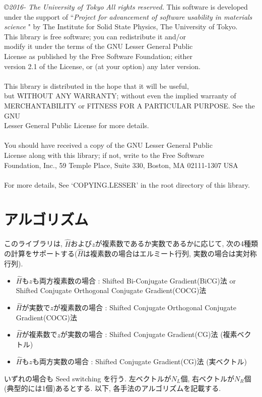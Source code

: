 \documentclass[12pt,titlepage]{jarticle}
\begin{document}
\noindent
{\it \copyright 2016- The University of Tokyo} {\it  All rights reserved.}
This software is developed under the support of ``{\it Project for advancement of software usability in materials science }" by The Institute for Solid State Physics, The University of Tokyo. 
 \\
This library is free software; you can redistribute it and/or \\
modify it under the terms of the GNU Lesser General Public \\
License as published by the Free Software Foundation; either \\
version 2.1 of the License, or (at your option) any later version. \\
 \\
This library is distributed in the hope that it will be useful, \\
but WITHOUT ANY WARRANTY; without even the implied warranty of \\
MERCHANTABILITY or FITNESS FOR A PARTICULAR PURPOSE.  See the GNU \\
Lesser General Public License for more details. \\
 \\
You should have received a copy of the GNU Lesser General Public \\
License along with this library; if not, write to the Free Software \\
Foundation, Inc., 59 Temple Place, Suite 330, Boston, MA  02111-1307  USA \\
 \\
For more details, See `COPYING.LESSER' in the root directory of this library.

\section{アルゴリズム}

このライブラリは, ${\hat H}$および$z$が複素数であるか実数であるかに応じて,
次の4種類の計算をサポートする(${\hat H}$は複素数の場合はエルミート行列, 実数の場合は実対称行列).

\begin{itemize}
\item ${\hat H}$も$z$も両方複素数の場合 : Shifted Bi-Conjugate Gradient(BiCG)法 \cite{BiCG} or Shifted Conjugate Orthogonal Conjugate Gradient(COCG)法 \cite{COCG}
\item ${\hat H}$が実数で$z$が複素数の場合 : Shifted Conjugate Orthogonal Conjugate Gradient(COCG)法 \cite{COCG}
\item ${\hat H}$が複素数で$z$が実数の場合 : Shifted Conjugate Gradient(CG)法 (複素ベクトル)
\item ${\hat H}$も$z$も両方実数の場合 : Shifted Conjugate Gradient(CG)法 (実ベクトル)
\end{itemize}
いずれの場合も Seed switching を行う.
左ベクトルが$N_L$個, 右ベクトルが$N_R$個(典型的には1個)あるとする.
以下, 各手法のアルゴリズムを記載する.
\end{document}
